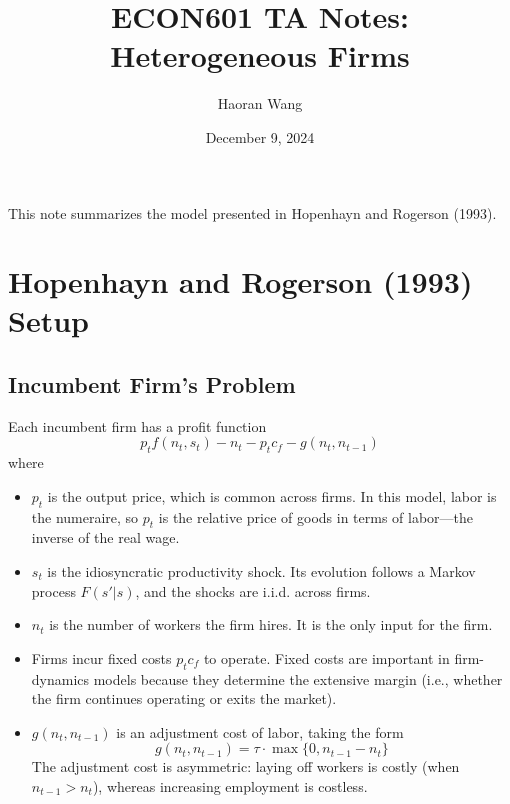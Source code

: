 \documentclass[12pt]{article}
\title{ECON601 TA Notes: Heterogeneous Firms}
\author{Haoran Wang }
\date{December 9, 2024}
\begin{document}
\maketitle

\tableofcontents


This note summarizes the model presented in Hopenhayn and Rogerson (1993). 

\section{Hopenhayn and Rogerson (1993) Setup}

\subsection{Incumbent Firm's Problem}
Each incumbent firm has a profit function 
\begin{equation}
	p_t f(n_t, s_t) - n_t - p_t c_f - g(n_t, n_{t-1})
\end{equation}
where
\begin{itemize}
		\item $p_t$ is the output price, which is common across firms. In this model, labor is the numeraire, so $p_t$ is the relative price of goods in terms of labor---the inverse of the real wage.
		\item $s_t$ is the idiosyncratic productivity shock. Its evolution follows a Markov process $F(s'|s)$, and the shocks are i.i.d. across firms.
	\item $n_t$ is the number of workers the firm hires. It is the only input for the firm.
		\item Firms incur fixed costs \( p_t c_f \) to operate. Fixed costs are important in firm-dynamics models because they determine the extensive margin (i.e., whether the firm continues operating or exits the market).
	\item $g(n_t, n_{t-1})$ is an adjustment cost of labor, taking the form
	\begin{equation}
		g(n_t, n_{t-1}) = \tau \cdot \max\{0, n_{t-1} - n_t\} 
	\end{equation}
		The adjustment cost is asymmetric: laying off workers is costly (when $n_{t-1} > n_t$), whereas increasing employment is costless.
\end{itemize}
\end{document}
